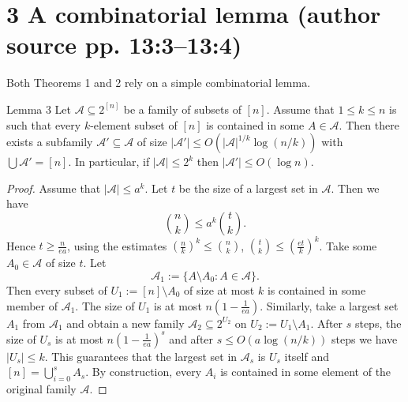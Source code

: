 \section*{3 A combinatorial lemma (author source pp. 13:3--13:4)}
Both Theorems 1 and 2 rely on a simple combinatorial lemma.
\begin{originalresult}{Lemma 3}
Let $\mathcal A\subseteq 2^{[n]}$ be a family of subsets of $[n]$. Assume that $1\le k\le n$ is such that every $k$-element subset of $[n]$ is contained in some $A\in\mathcal A$. Then there exists a subfamily $\mathcal A'\subseteq\mathcal A$ of size $|\mathcal A'|\le O(|\mathcal A|^{1/k}\log(n/k))$ with $\bigcup\mathcal A'=[n]$. In particular, if $|\mathcal A|\le 2^k$ then $|\mathcal A'|\le O(\log n)$.
\end{originalresult}
\begin{proof}
Assume that $|\mathcal A|\le a^k$. Let $t$ be the size of a largest set in $\mathcal A$. Then we have
\[\binom nk\le a^k\binom tk.\]
Hence $t\ge\frac n{ea}$, using the estimates $(\frac nk)^k\le\binom nk$, $\binom tk\le(\frac{et}k)^k$. Take some $A_0\in\mathcal A$ of size $t$. Let
\[\mathcal A_1:=\{A\setminus A_0:A\in\mathcal A\}.\]
Then every subset of $U_1:=[n]\setminus A_0$ of size at most $k$ is contained in some member of $\mathcal A_1$. The size of $U_1$ is at most $n(1-\frac1{ea})$. Similarly, take a largest set $A_1$ from $\mathcal A_1$ and obtain a new family $\mathcal A_2\subseteq 2^{U_2}$ on $U_2:=U_1\setminus A_1$. After $s$ steps, the size of $U_s$ is at most $n(1-\frac1{ea})^s$ and after $s\le O(a\log(n/k))$ steps we have $|U_s|\le k$. This guarantees that the largest set in $\mathcal A_s$ is $U_s$ itself and $[n]=\bigcup_{i=0}^s A_s$. By construction, every $A_i$ is contained in some element of the original family $\mathcal A$.
\end{proof}
